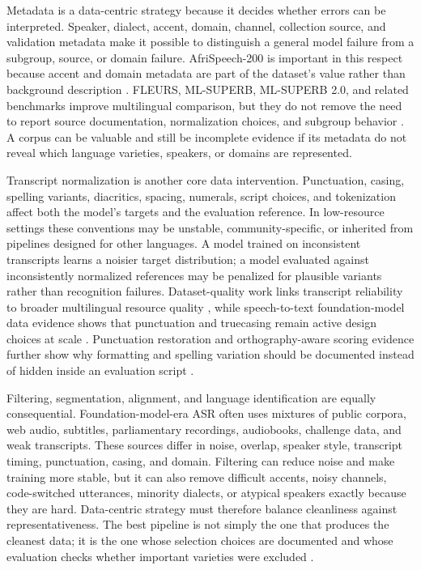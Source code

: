 \documentclass[pdflatex,sn-basic,iicol]{sn-jnl}
\theoremstyle{thmstyleone}
\theoremstyle{thmstyletwo}
\theoremstyle{thmstylethree}
\begin{document}
Metadata is a data-centric strategy because it decides whether errors can be interpreted. Speaker, dialect, accent, domain, channel, collection source, and validation metadata make it possible to distinguish a general model failure from a subgroup, source, or domain failure. AfriSpeech-200 is important in this respect because accent and domain metadata are part of the dataset's value rather than background description \citep{olatunji2023_afrispeech200}. FLEURS, ML-SUPERB, ML-SUPERB 2.0, and related benchmarks improve multilingual comparison, but they do not remove the need to report source documentation, normalization choices, and subgroup behavior \citep{conneau2022fleurs,shi2023mlsuperb,shi2024mlsuperb2,chen2025mlsuperb2challenge}. A corpus can be valuable and still be incomplete evidence if its metadata do not reveal which language varieties, speakers, or domains are represented.

Transcript normalization is another core data intervention. Punctuation, casing, spelling variants, diacritics, spacing, numerals, script choices, and tokenization affect both the model's targets and the evaluation reference. In low-resource settings these conventions may be unstable, community-specific, or inherited from pipelines designed for other languages. A model trained on inconsistent transcripts learns a noisier target distribution; a model evaluated against inconsistently normalized references may be penalized for plausible variants rather than recognition failures. Dataset-quality work links transcript reliability to broader multilingual resource quality \citep{lau2025_data_quality_multilingual_speech}, while speech-to-text foundation-model data evidence shows that punctuation and truecasing remain active design choices at scale \citep{tian24_interspeech}. Punctuation restoration and orthography-aware scoring evidence further show why formatting and spelling variation should be documented instead of hidden inside an evaluation script \citep{chen21d_interspeech,karita2023lenient}.

Filtering, segmentation, alignment, and language identification are equally consequential. Foundation-model-era ASR often uses mixtures of public corpora, web audio, subtitles, parliamentary recordings, audiobooks, challenge data, and weak transcripts. These sources differ in noise, overlap, speaker style, transcript timing, punctuation, casing, and domain. Filtering can reduce noise and make training more stable, but it can also remove difficult accents, noisy channels, code-switched utterances, minority dialects, or atypical speakers exactly because they are hard. Data-centric strategy must therefore balance cleanliness against representativeness. The best pipeline is not simply the one that produces the cleanest data; it is the one whose selection choices are documented and whose evaluation checks whether important varieties were excluded \citep{wang2021voxpopuli,tian24_interspeech}.
\end{document}
